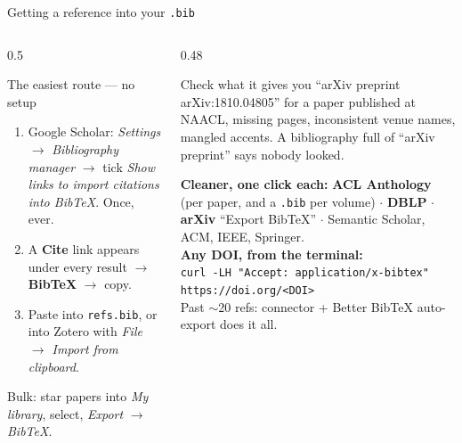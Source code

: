 \documentclass[aspectratio=169,11pt]{beamer}
\newcommand{\code}[1]{\texttt{\small #1}}
\newcommand{\key}[1]{\textbf{\color{brand}#1}}
\begin{document}
\begin{frame}{Getting a reference into your \code{.bib}}
\begin{columns}[T]
\begin{column}{0.5\textwidth}
\begin{block}{The easiest route --- no setup}
\footnotesize
\begin{enumerate}
  \item Google Scholar: \emph{Settings} $\rightarrow$ \emph{Bibliography
        manager} $\rightarrow$ tick \emph{Show links to import citations into
        BibTeX}. Once, ever.
  \item A \key{Cite} link appears under every result $\rightarrow$
        \key{BibTeX} $\rightarrow$ copy.
  \item Paste into \code{refs.bib}, or into Zotero with \emph{File
        $\rightarrow$ Import from clipboard}.
\end{enumerate}
Bulk: star papers into \emph{My library}, select, \emph{Export} $\rightarrow$
\emph{BibTeX}.
\end{block}
\end{column}
\begin{column}{0.48\textwidth}
\begin{alertblock}{Check what it gives you}
\footnotesize
``arXiv preprint arXiv:1810.04805'' for a paper published at NAACL, missing
pages, inconsistent venue names, mangled accents. A bibliography full of
``arXiv preprint'' says nobody looked.
\end{alertblock}
\footnotesize
\textbf{Cleaner, one click each:} \key{ACL Anthology} (per paper, and a
\code{.bib} per volume) $\cdot$ \key{DBLP} $\cdot$ \key{arXiv} ``Export
BibTeX'' $\cdot$ Semantic Scholar, ACM, IEEE, Springer.\\[3pt]
\textbf{Any DOI, from the terminal:}\\
\code{curl -LH "Accept: application/x-bibtex"}\\
\code{https://doi.org/<DOI>}\\[3pt]
Past $\sim$20 refs: connector + Better BibTeX auto-export does it all.
\end{column}
\end{columns}
\end{frame}
\end{document}
